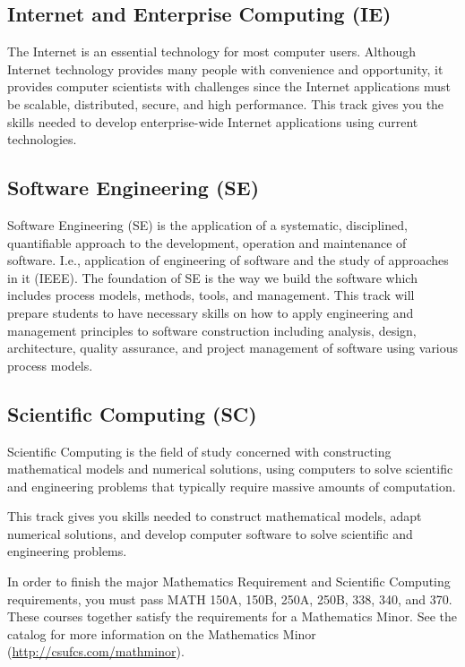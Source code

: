 \documentclass{book}
\newcommand{\IeTrackName}{Internet and Enterprise Computing (IE)}
\newcommand{\ScTrackName}{Scientific Computing (SC)}
\newcommand{\SeTrackName}{Software Engineering (SE)}
\newcommand{\shrunkurl}[1]{\url{http://csufcs.com/#1}}
\begin{document}
\subsection{\IeTrackName}
\IeTrackIndex
The Internet is an essential technology for most computer users. Although Internet technology provides many people with convenience and opportunity, it provides computer scientists with challenges since the Internet applications must be scalable, distributed, secure, and high performance. This track gives you the skills needed to develop enterprise-wide Internet applications using current technologies.

\subsection{\SeTrackName}
\SeTrackIndex
Software Engineering (SE) is the application of a systematic, disciplined, quantifiable approach to the development, operation and maintenance of software. I.e., application of engineering of software and the study of approaches in it (IEEE).  The foundation of SE is the way we build the software which includes process models, methods, tools, and management.  This track will prepare students to have necessary skills on how to apply engineering and management principles to software construction including analysis, design, architecture, quality assurance, and project management of software using various process models.

\subsection{\ScTrackName}
\ScTrackIndex

Scientific Computing is the field of study concerned with constructing mathematical models and numerical solutions, using computers to solve scientific and engineering problems that typically require massive amounts of computation.

This track gives you skills needed to construct mathematical models, adapt numerical solutions, and develop computer software to solve scientific and engineering problems.

In order to finish the major Mathematics Requirement and Scientific Computing requirements, you must pass MATH 150A, 150B, 250A, 250B, 338, 340, and 370. These courses together satisfy the requirements for a Mathematics Minor. See the catalog for more information on the Mathematics Minor (\shrunkurl{mathminor}).
\end{document}
